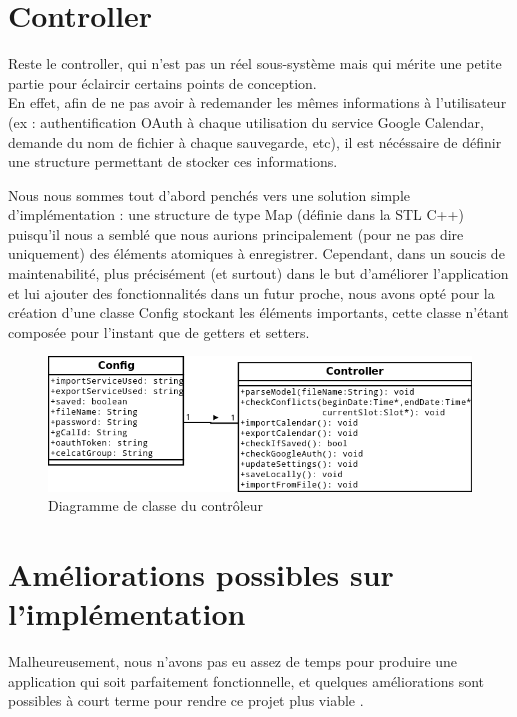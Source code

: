 \chapter{Controller}
	Reste le controller, qui n'est pas un réel sous-système mais qui mérite une petite partie pour éclaircir certains points de conception.\\
	
	En effet, afin de ne pas avoir à redemander les mêmes informations à l'utilisateur (ex : authentification OAuth à chaque utilisation du service Google Calendar, demande du nom de fichier à chaque sauvegarde, etc), il est nécéssaire de définir une structure permettant de stocker ces informations.
	
	Nous nous sommes tout d'abord penchés vers une solution simple d'implémentation : une structure de type Map (définie dans la STL C++) puisqu'il nous a semblé que nous aurions principalement (pour ne pas dire uniquement) des éléments atomiques à enregistrer. Cependant, dans un soucis de maintenabilité, plus précisément (et surtout) dans le but d'améliorer l'application et lui ajouter des fonctionnalités dans un futur proche, nous avons opté pour la création d'une classe Config stockant les éléments importants, cette classe n'étant composée pour l'instant que de getters et setters.
	\begin{figure}[!h]
		\centering
		\includegraphics[scale=0.65]{diagclasses_controller.png}
		\caption{Diagramme de classe du contrôleur}
	\end{figure}
	\FloatBarrier
	
	
\chapter{Améliorations possibles sur l'implémentation}
	Malheureusement, nous n'avons pas eu assez de temps pour produire une application qui soit parfaitement fonctionnelle, et quelques améliorations sont possibles à court terme pour rendre ce projet plus \og viable \fg.\\
	
